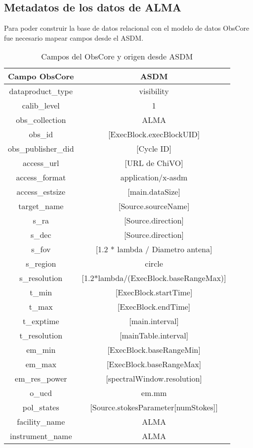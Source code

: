 \subsection{Metadatos de los datos de ALMA}
Para poder construir la base de datos relacional con el modelo de datos ObsCore fue necesario mapear campos desde el ASDM.
\begin{table}[h!t]
    \centering
    \begin{tabular}{|c|c|}
        \hline
        \textbf{Campo ObsCore} & ASDM \\
        \hline
        dataproduct\_type	& visibility \\
        calib\_level		& 1 \\
        obs\_collection		& ALMA \\
        obs\_id				& [ExecBlock.execBlockUID] \\
        obs\_publisher\_did	& [Cycle ID] \\
        access\_url			& [URL de ChiVO] \\
        access\_format		& application/x-asdm \\
        access\_estsize		& [main.dataSize] \\
        target\_name		& [Source.sourceName] \\
        s\_ra				& [Source.direction] \\
        s\_dec				& [Source.direction] \\
        s\_fov				& [1.2 * lambda / Diametro antena] \\
        s\_region			& circle \\
        s\_resolution		& [1.2*lambda/(ExecBlock.baseRangeMax)] \\
		t\_min				& [ExecBlock.startTime] \\
		t\_max				& [ExecBlock.endTime] \\
		t\_exptime			& [main.interval] \\
		t\_resolution		& [mainTable.interval] \\
		em\_min				& [ExecBlock.baseRangeMin] \\
		em\_max				& [ExecBlock.baseRangeMax] \\
		em\_res\_power		& [spectralWindow.resolution] \\
		o\_ucd				& em.mm \\
		pol\_states			& [Source.stokesParameter[numStokes]] \\
		facility\_name		& ALMA \\
		instrument\_name	& ALMA \\
		\hline
    \end{tabular}
    \caption{Campos del ObsCore y origen desde ASDM}
    \label{table:obsasdm}
\end{table}

